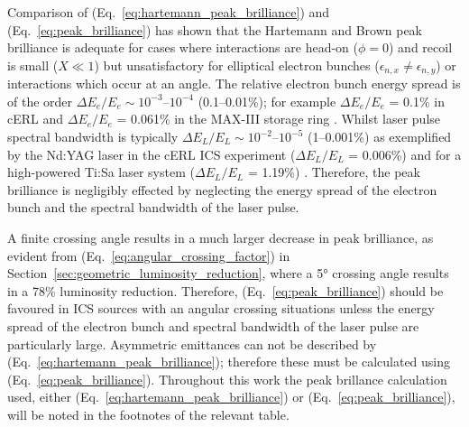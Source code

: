 \documentclass[../main.tex]{subfiles}
\begin{document}
Comparison of (Eq.~\ref{eq:hartemann_peak_brilliance}) and (Eq.~\ref{eq:peak_brilliance}) has shown that the Hartemann and Brown peak brilliance is adequate for cases where interactions are head-on ($\phi=0$) and recoil is small ($X \ll 1$) but unsatisfactory for elliptical electron bunches ($\epsilon_{n,x} \neq \epsilon_{n,y}$) or interactions which occur at an angle. The relative electron bunch energy spread is of the order $\Delta E_{e}/E_{e} \sim 10^{-3}$--$10^{-4}$ (0.1--0.01\%); for example $\Delta E_{e}/E_{e}$ = 0.1\% in cERL \cite{akagi2016narrow} and $\Delta E_{e}/E_{e}$ = 0.061\% in the MAX-III storage ring \cite{sjostrom2009max}. Whilst laser pulse spectral bandwidth is typically $\Delta E_{L}/E_{L} \sim 10^{-2}$--$10^{-5}$ (1--0.001\%) as exemplified by the Nd:YAG laser in the cERL ICS experiment ($\Delta E_{L}/E_{L}$ = 0.006\%) \cite{akagi2016narrow} and for a high-powered Ti:Sa laser system ($\Delta E_{L}/E_{L}$ = 1.19\%) \cite{liu2021review}. Therefore, the peak brilliance is negligibly effected by neglecting the energy spread of the electron bunch and the spectral bandwidth of the laser pulse.

A finite crossing angle results in a much larger decrease in peak brilliance, as evident from (Eq.~\ref{eq:angular_crossing_factor}) in Section~\ref{sec:geometric_luminosity_reduction}, where a 5\si{\degree} crossing angle results in a 78\% luminosity reduction. Therefore, (Eq.~\ref{eq:peak_brilliance}) should be favoured in ICS sources with an angular crossing situations unless the energy spread of the electron bunch and spectral bandwidth of the laser pulse are particularly large. Asymmetric emittances can not be described by (Eq.~\ref{eq:hartemann_peak_brilliance}); therefore these must be calculated using (Eq.~\ref{eq:peak_brilliance}). Throughout this work the peak brillance calculation used, either (Eq.~\ref{eq:hartemann_peak_brilliance}) or (Eq.~\ref{eq:peak_brilliance}), will be noted in the footnotes of the relevant table.  
\end{document}
